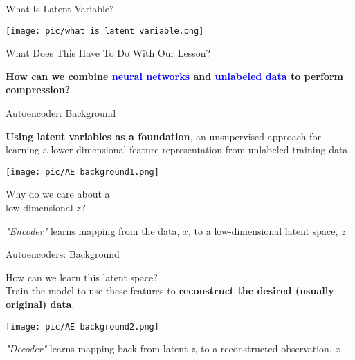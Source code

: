 \documentclass[serif, aspectratio=169]{beamer}
\begin{document}
\begin{frame}{What Is Latent Variable?}
      \begin{center}
        \texttt{[image: pic/what is latent variable.png]} 
    \end{center}
\end{frame}


\begin{frame}{What Does This Have To Do With Our Lesson?}
    \vspace{1cm}
    \begin{center}
        \textbf{How can we combine \textcolor{blue}{neural networks} and \textcolor{blue}{unlabeled data} to perform compression?}
    \end{center}
\end{frame}


\begin{frame}{Autoencoder: Background}
    \begin{center}
        \textbf{Using latent variables as a foundation}, an unsupervised approach for learning a lower-dimensional feature representation from unlabeled training data.
        
        \vspace{0.3cm}
        
        \begin{minipage}{0.6\textwidth}
            \centering
            \texttt{[image: pic/AE background1.png]}
        \end{minipage}
        \hspace{0.05\textwidth} 
        \begin{minipage}{0.3\textwidth}
            \raggedright
            Why do we care about a \\ low-dimensional \textit{$z$}?
        \end{minipage}
        
        \vspace{0.3cm}
        
        \textit{"Encoder"} learns mapping from the data, \textit{$x$}, to a low-dimensional latent space, \textit{$z$}
    \end{center}
\end{frame}

\begin{frame}{Autoencoders: Background}

    How can we learn this latent space? \\
    Train the model to use these features to \textbf{reconstruct the desired (usually original) data}.


    \begin{center}
                
        \texttt{[image: pic/AE background2.png]} 

        
        \textit{"Decoder"} learns mapping back from latent \textit{z}, to a reconstructed observation, \textit{x}
    \end{center}
\end{frame}
\end{document}
